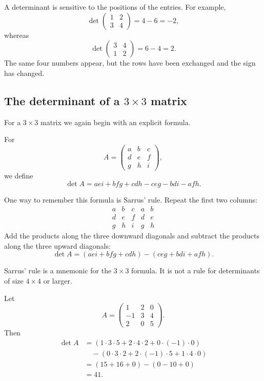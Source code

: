 A determinant is sensitive to the positions of the entries. For example,
\[
\det\begin{pmatrix}1&2\\3&4\end{pmatrix}=4-6=-2,
\]
whereas
\[
\det\begin{pmatrix}3&4\\1&2\end{pmatrix}=6-4=2.
\]
The same four numbers appear, but the rows have been exchanged and the sign has changed.

\subsection{The determinant of a \(3\times3\) matrix}

For a \(3\times3\) matrix we again begin with an explicit formula.

\begin{definitionbox}
For
\[
A=\begin{pmatrix}
a&b&c\\
d&e&f\\
g&h&i
\end{pmatrix},
\]
we define
\[
\det A=aei+bfg+cdh-ceg-bdi-afh.
\]
\end{definitionbox}

One way to remember this formula is Sarrus' rule. Repeat the first two columns:
\[
\begin{array}{ccc|cc}
a&b&c&a&b\\
d&e&f&d&e\\
g&h&i&g&h
\end{array}
\]
Add the products along the three downward diagonals and subtract the products along the three upward diagonals:
\[
\det A=(aei+bfg+cdh)-(ceg+bdi+afh).
\]

\begin{remarkbox}
Sarrus' rule is a mnemonic for the \(3\times3\) formula. It is not a rule for determinants of size \(4\times4\) or larger.
\end{remarkbox}

\begin{examplebox}
Let
\[
A=\begin{pmatrix}
1&2&0\\
-1&3&4\\
2&0&5
\end{pmatrix}.
\]
Then
\[
\begin{aligned}
\det A
&=(1\cdot3\cdot5+2\cdot4\cdot2+0\cdot(-1)\cdot0)\\
&\quad -(0\cdot3\cdot2+2\cdot(-1)\cdot5+1\cdot4\cdot0)\\
&=(15+16+0)-(0-10+0)\\
&=41.
\end{aligned}
\]
\end{examplebox}


